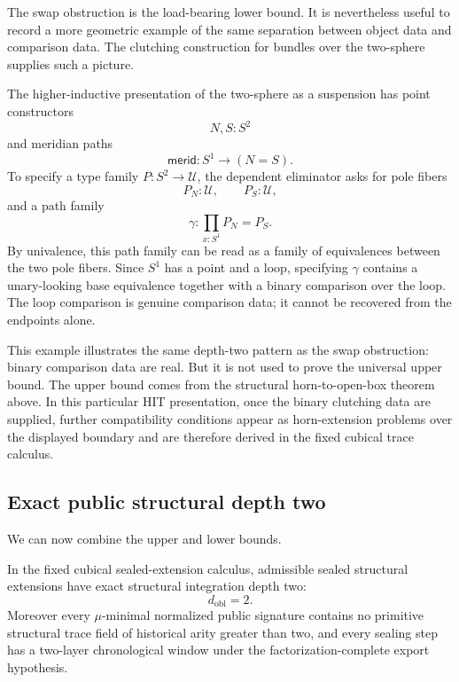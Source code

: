 The swap obstruction is the load-bearing lower bound.  It is nevertheless useful to record a
more geometric example of the same separation between object data and comparison data.  The
clutching construction for bundles over the two-sphere supplies such a picture.

\begin{remark}
\label{rem:clutching}
The higher-inductive presentation of the two-sphere as a suspension has point constructors
\[
  N,S:S^2
\]
and meridian paths
\[
  \mathsf{merid}:S^1\to (N=S).
\]
To specify a type family \(P:S^2\to\mathcal U\), the dependent eliminator asks for pole
fibers
\[
  P_N:\mathcal U,
  \qquad
  P_S:\mathcal U,
\]
and a path family
\[
  \gamma: \prod_{x:S^1} P_N=P_S.
\]
By univalence, this path family can be read as a family of equivalences between the two pole
fibers.  Since \(S^1\) has a point and a loop, specifying \(\gamma\) contains a unary-looking
base equivalence together with a binary comparison over the loop.  The loop comparison is
genuine comparison data; it cannot be recovered from the endpoints alone.

This example illustrates the same depth-two pattern as the swap obstruction: binary
comparison data are real.  But it is not used to prove the universal upper bound.  The upper
bound comes from the structural horn-to-open-box theorem above.  In this particular HIT
presentation, once the binary clutching data are supplied, further compatibility conditions
appear as horn-extension problems over the displayed boundary and are therefore derived in
the fixed cubical trace calculus.
\end{remark}

\subsection{Exact public structural depth two}
\label{subsec:exact-depth-two-conclusion}

We can now combine the upper and lower bounds.

\begin{corollary}
\label{cor:exact-depth-two}
In the fixed cubical sealed-extension calculus, admissible sealed structural extensions have
exact structural integration depth two:
\[
  d_{\mathrm{obl}}=2.
\]
Moreover every \(\mu\)-minimal normalized public signature contains no primitive structural
trace field of historical arity greater than two, and every sealing step has a two-layer
chronological window under the factorization-complete export hypothesis.
\end{corollary}

